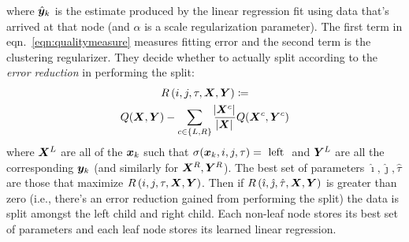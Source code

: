 where \(\hat{\bm{y}}_k\) is the estimate produced by the linear regression fit using data that's arrived at that node (and \(\alpha\) is a scale regularization parameter).
%
The first term in eqn.~\eqref{eqn:qualitymeasure} measures fitting error and the second term is the clustering regularizer.
%
They decide whether to actually split according to the \textit{error reduction} in performing the split:
\begin{multline*}
    R\left(i, j, \tau, \bm{X}, \bm{Y} \right) \coloneqq \\ Q(\bm{X}, \bm{Y}) - \sum_{c\in\left\{L, R\right\}} \frac{\abs{\bm{X}^c}}{\abs{\bm{X}}} Q(\bm{X}^c, \bm{Y}^c)
\end{multline*}
where \(\bm{X}^L\) are all of the \(\bm{x}_k\) such that \(\sigma(\bm{x}_k, i, j, \tau) = \text{ left }\) and \(\bm{Y}^L\) are all the corresponding \(\bm{y}_k\) (and similarly for \(\bm{X}^R, \bm{Y}^R\)).
%
The best set of parameters \(\hat{\imath}, \hat{\jmath}, \hat{\tau}\) are those that maximize \(R\left(i, j, \tau, \bm{X}, \bm{Y} \right)\).
%
Then if \(R\left(\hat{\imath}, \hat{\jmath}, \hat{\tau}, \bm{X}, \bm{Y} \right)\) is greater than zero (i.e., there's an error reduction gained from performing the split) the data is split amongst the left child and right child.
%
Each non-leaf node stores its best set of parameters and each leaf node stores its learned linear regression.